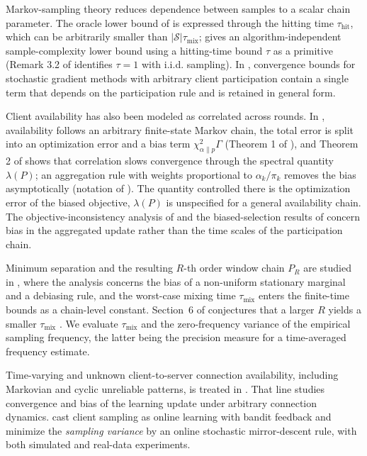 \documentclass[twoside,11pt]{article}
\begin{document}
Markov-sampling theory reduces dependence between samples to a scalar chain parameter. The oracle lower bound of \citep[Theorem~4.1]{ref13} is expressed through the hitting time $\tau_{\mathrm{hit}}$, which can be arbitrarily smaller than $|\mathcal{S}|\tau_{\mathrm{mix}}$; \citep{ref14} gives an algorithm-independent sample-complexity lower bound using a hitting-time bound $\tau$ as a primitive (Remark 3.2 of \citep{ref14} identifies $\tau=1$ with i.i.d. sampling). In \citep{ref15}, convergence bounds for stochastic gradient methods with arbitrary client participation contain a single term that depends on the participation rule and is retained in general form.

Client availability has also been modeled as correlated across rounds. In \citep{ref16}, availability follows an arbitrary finite-state Markov chain, the total error is split into an optimization error and a bias term $\chi^{2}_{\alpha\|p}\Gamma$ (Theorem 1 of \citep{ref16}), and Theorem 2 of \citep{ref16} shows that correlation slows convergence through the spectral quantity $\lambda(P)$; an aggregation rule with weights proportional to $\alpha_k/\pi_k$ removes the bias asymptotically (notation of \citep{ref16}). The quantity controlled there is the optimization error of the biased objective, $\lambda(P)$ is unspecified for a general availability chain. The objective-inconsistency analysis of \citep{ref17} and the biased-selection results of \citep{ref18} concern bias in the aggregated update rather than the time scales of the participation chain.

Minimum separation and the resulting $R$-th order window chain $P_R$ are studied in \citep{ref1}, where the analysis concerns the bias of a non-uniform stationary marginal and a debiasing rule, and the worst-case mixing time $\tau_{\mathrm{mix}}$ enters the finite-time bounds as a chain-level constant. Section~6 of \citep{ref1} conjectures that a larger $R$ yields a smaller $\tau_{\mathrm{mix}}$ \citep[App.~H]{ref1}. We evaluate $\tau_{\mathrm{mix}}$ and the zero-frequency variance of the empirical sampling frequency, the latter being the precision measure for a time-averaged frequency estimate.

Time-varying and unknown client-to-server connection availability, including Markovian and cyclic unreliable patterns, is treated in \citep{ref19}. That line studies convergence and bias of the learning update under arbitrary connection dynamics. \citet{ref27} cast client sampling as online learning with bandit feedback and minimize the \emph{sampling variance} by an online stochastic mirror-descent rule, with both simulated and real-data experiments.
\end{document}

